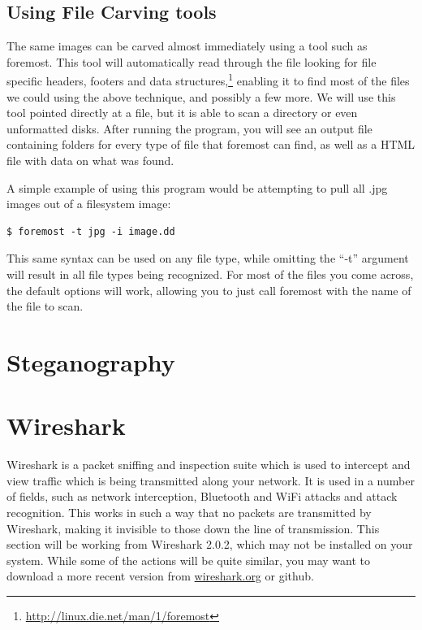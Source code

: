 		\subsection{Using File Carving tools}
			The same images can be carved almost immediately using a tool such as foremost. 
			This tool will automatically read through the file looking for file specific headers, footers and data structures,\footnote{\url{http://linux.die.net/man/1/foremost}}
			enabling it to find most of the files we could using the above technique, and possibly a few more. 
			We will use this tool pointed directly at a file, but it is able to scan a directory or even unformatted disks. 
			After running the program, you will see an output file containing folders for every type of file that foremost can find, as well as a HTML file with data on what was found. 

			A simple example of using this program would be attempting to pull all .jpg images out of a filesystem image:
			\begin{lstlisting}[style=CLI]
				$ foremost -t jpg -i image.dd
			\end{lstlisting}
			This same syntax can be used on any file type, while omitting the ``-t'' argument will result in all file types being recognized. 
			For most of the files you come across, the default options will work, allowing you to just call foremost with the name of the file to scan. 


	\section{Steganography}
	\section{Wireshark}
		Wireshark is a packet sniffing and inspection suite which is used to intercept and view traffic which is being transmitted along your network.\cite{WSUG} 
		It is used in a number of fields, such as network interception, Bluetooth and WiFi attacks and attack recognition. 
		This works in such a way that no packets are transmitted by Wireshark, making it invisible to those down the line of transmission. 
		This section will be working from Wireshark 2.0.2, which may not be installed on your system. 
		While some of the actions will be quite similar, you may want to download a more recent version from \url{wireshark.org} or github.

